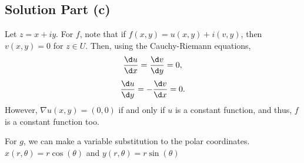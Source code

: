 \subsection*{Solution Part (c)}
Let $z = x+iy$. For $f$, note that if $f(x,y) = u(x,y)+i(v,y)$, then $v(x,y) = 0$ for $z \in U$. Then, using the Cauchy-Riemann equations,
\[ \frac{\d u}{\d x} = \frac{\d v}{\d y} = 0, \]
\[ \frac{\d u}{\d y} = -\frac{\d v}{\d x} = 0. \]
However, $\nabla u(x,y) = (0,0)$ if and only if $u$ is a constant function, and thus, $f$ is a constant function too.

For $g$, we can make a variable substitution to the polar coordinates. $x(r,\theta) = r\cos(\theta)$ and $y(r,\theta) = r\sin(\theta)$